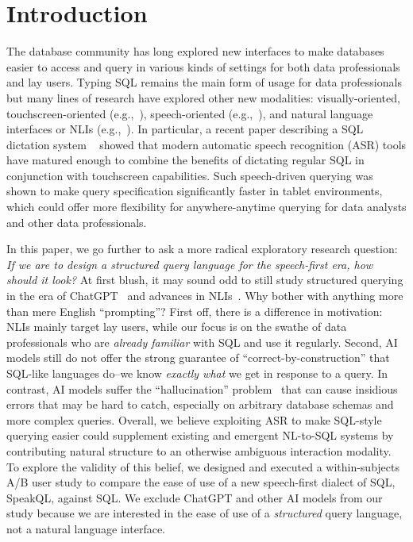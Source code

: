 \section{Introduction}


The database community has long explored new interfaces to make databases easier to access and query in various kinds of settings for both data professionals and lay users.
Typing SQL remains the main form of usage for data professionals but many lines of research have explored other new modalities: visually-oriented, touchscreen-oriented (e.g.,~\cite{10.14778/2536274.2536311}), speech-oriented (e.g.,~\cite{Shah2020}), and natural language interfaces or NLIs (e.g.,~\cite{Kim2020, gan-etal-2021-natural-sql, Scholak2021:PICARD, https://doi.org/10.48550/arxiv.2201.05966}).
In particular, a recent paper describing a SQL dictation system ~\cite{Shah2020} showed that modern automatic speech recognition (ASR) tools have matured enough to combine the benefits of dictating regular SQL in conjunction with touchscreen capabilities. Such speech-driven querying was shown to make query specification significantly faster in tablet environments, which could offer more flexibility for anywhere-anytime querying for data analysts and other data professionals.

In this paper, we go further to ask a more radical exploratory research question: \textit{If we are to design a structured query language for the speech-first era, how should it look?}
At first blush, it may sound odd to still study structured querying in the era of ChatGPT~\cite{https://doi.org/10.48550/arxiv.2005.14165, radford2018improving, openai-chatgpt-blog-post} and advances in NLIs~\cite{Kim2020}.
Why bother with anything more than mere English ``prompting''?
First off, there is a difference in motivation: NLIs mainly target lay users, while our focus is on the swathe of data professionals who are \textit{already familiar} with SQL and use it regularly. 
Second, AI models still do not offer the strong guarantee of ``correct-by-construction'' that SQL-like languages do--we know \textit{exactly what} we get in response to a query.
In contrast, AI models suffer the ``hallucination'' problem~\cite{10.1145/3571730} that can cause insidious errors that may be hard to catch, especially on arbitrary database schemas and more complex queries. 
Overall, we believe exploiting ASR to make SQL-style querying easier could supplement existing and emergent NL-to-SQL systems by contributing natural structure to an otherwise ambiguous interaction modality. To explore the validity of this belief, we designed and executed a within-subjects A/B user study to compare the ease of use of a new speech-first dialect of SQL, SpeakQL, against SQL. We exclude ChatGPT and other AI models from our study because we are interested in the ease of use of a \textit{structured} query language, not a natural language interface.

